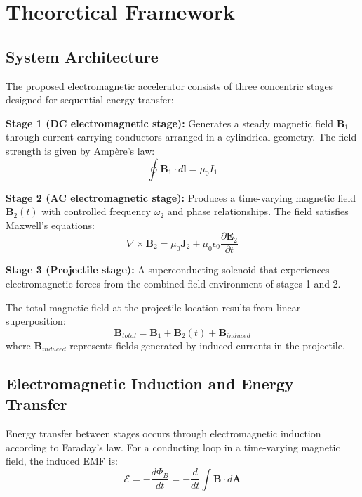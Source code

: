 \documentclass[12pt,a4paper]{article}
\begin{document}
\section{Theoretical Framework}

\subsection{System Architecture}

The proposed electromagnetic accelerator consists of three concentric stages designed for sequential energy transfer:

\textbf{Stage 1 (DC electromagnetic stage):} Generates a steady magnetic field $\mathbf{B}_1$ through current-carrying conductors arranged in a cylindrical geometry. The field strength is given by Ampère's law:
\begin{equation}
\oint \mathbf{B}_1 \cdot d\mathbf{l} = \mu_0 I_1
\end{equation}

\textbf{Stage 2 (AC electromagnetic stage):} Produces a time-varying magnetic field $\mathbf{B}_2(t)$ with controlled frequency $\omega_2$ and phase relationships. The field satisfies Maxwell's equations:
\begin{equation}
\nabla \times \mathbf{B}_2 = \mu_0 \mathbf{J}_2 + \mu_0 \epsilon_0 \frac{\partial \mathbf{E}_2}{\partial t}
\end{equation}

\textbf{Stage 3 (Projectile stage):} A superconducting solenoid that experiences electromagnetic forces from the combined field environment of stages 1 and 2.

The total magnetic field at the projectile location results from linear superposition:
\begin{equation}
\mathbf{B}_{total} = \mathbf{B}_1 + \mathbf{B}_2(t) + \mathbf{B}_{induced}
\end{equation}
where $\mathbf{B}_{induced}$ represents fields generated by induced currents in the projectile.

\subsection{Electromagnetic Induction and Energy Transfer}

Energy transfer between stages occurs through electromagnetic induction according to Faraday's law. For a conducting loop in a time-varying magnetic field, the induced EMF is:
\begin{equation}
\mathcal{E} = -\frac{d\Phi_B}{dt} = -\frac{d}{dt}\int \mathbf{B} \cdot d\mathbf{A}
\end{equation}
\end{document}
